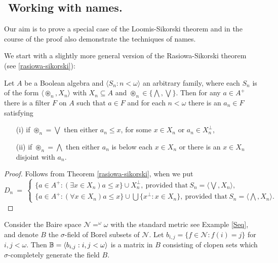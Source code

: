 \subsection{${}$ \hspace{-1em}Working with names.}

Our aim is to prove a special case of the Loomis-Sikorski theorem and in the course of the proof
also demonstrate the techniques of names.

We start with a slightly more general version of the Rasiowa-Sikorski theorem (see \ref{rasiowa-sikorski}):

\begin{theorem}\label{gen_RS}
Let $A$ be a Boolean algebra and $\langle S_n:n<\omega\rangle$ an arbitrary family, where each $S_n$ is of
the form $\langle\circledast_n,X_n\rangle$ with $X_n\subseteq A$ and $\circledast_n\in\{\bigwedge,\bigvee\}$. Then for any $a\in A^+$ there
is a filter $F$ on $A$ such that $a\in F$ and for each $n<\omega$ there is an $a_n\in F$ satisfying
\begin{itemize}
 \item[(i)] if $\circledast_n=\bigvee$ then either $a_n \leq x$, for some $x \in X_n$
	 or $a_n\in X_n^\perp$,
 \item[(ii)] if $\circledast_n=\bigwedge$ then either $a_n$ is below each $x\in X_n$ or there is an $x\in X_n$ disjoint with $a_n$.
\end{itemize}
\end{theorem}
\begin{proof} Follows from Theorem \ref{rasiowa-sikorski}, when we put
$$
D_n \ = \ \begin{cases}
           \{a \in A^+: (\exists x \in X_n) a \leq x \} \cup X_n^\perp, \ \text{provided that} \
			 S_n=\langle\bigvee,X_n\rangle, \\
	   \{a \in A^+: (\forall x \in X_n) a \leq x\} \cup
		\bigcup\{x^\perp : x \in X_n\},  \ \text{provided that} \
			 S_n=\langle\bigwedge,X_n\rangle.
          \end{cases}
$$
\end{proof}

Consider the Baire space ${\mathcal N}= ^\omega\omega$ with the standard metric
see Example \ref{Seq},
and denote $B$ the $\sigma$-field of Borel subsets of $\mathcal N$.
Let $b_{i,j}=\{f\in{\mathcal N}:f(i)=j\}$ for $i,j<\omega$. Then ${\mathbb B}=\langle b_{i,j}:i,j<\omega\rangle$ is a matrix in $B$ consisting
of clopen sets which $\sigma$-completely generate the field $B$.

